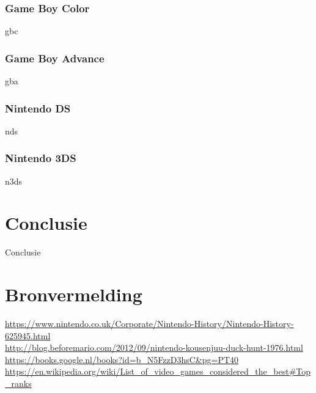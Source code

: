 \documentclass{article}
\begin{document}
\subsubsection{Game Boy Color}
gbc
\subsubsection{Game Boy Advance}
gba
\subsubsection{Nintendo DS}
nds
\subsubsection{Nintendo 3DS}
n3ds
\section{Conclusie}
Conclusie
\section{Bronvermelding}
\url{https://www.nintendo.co.uk/Corporate/Nintendo-History/Nintendo-History-625945.html}\\ 
\url{http://blog.beforemario.com/2012/09/nintendo-kousenjuu-duck-hunt-1976.html}\\ 
\url{https://books.google.nl/books?id=b_N5FzzD3hsC&pg=PT40}\\ 
\url{https://en.wikipedia.org/wiki/List_of_video_games_considered_the_best#Top_ranks}
\end{document}
